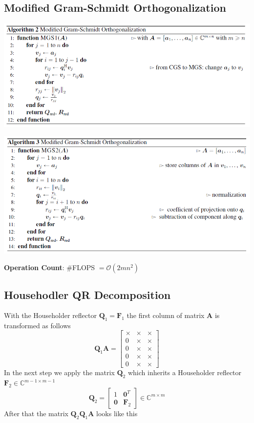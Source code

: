\documentclass[english]{latex4ei/latex4ei_sheet}
\begin{document}
\begin{sectionbox}
\subsection{Modified Gram-Schmidt Orthogonalization}
\includegraphics[width=\textwidth]{img/modified_gram_schmidt}

\includegraphics[width=\textwidth]{img/classic_gram_schmidt2.png}

\textbf{Operation Count}: \#FLOPS $=\mathcal{O}(2mn^2)$
\end{sectionbox}
\begin{sectionbox}
\subsection{Househodler QR Decomposition}

With the Householder reflector $\mathbf{Q}_1 = \mathbf{F}_1$ the first column of matrix $\mathbf{A}$ is transformed as follows
$$\mathbf{Q}_1 \mathbf{A} = \begin{bmatrix}
\times & \times & \times \\
0 & \times & \times \\
0 & \times & \times \\
0 & \times & \times \\
0 & \times & \times
\end{bmatrix}$$
In the next step we apply the matrix $\mathbf{Q}_2$ which inherits a Householder reflector $\mathbf{F}_2\in\mathbb{C}^{m-1\times m-1}$
$$\mathbf{Q}_2 = \begin{bmatrix}
1 & \mathbf{0}^T \\
\mathbf{0} & \mathbf{F}_2
\end{bmatrix} \in \mathbb{C}^{m \times m}$$
After that the matrix $\mathbf{Q}_2\mathbf{Q}_1\mathbf{A}$ looks like this
\end{sectionbox}
\end{document}
